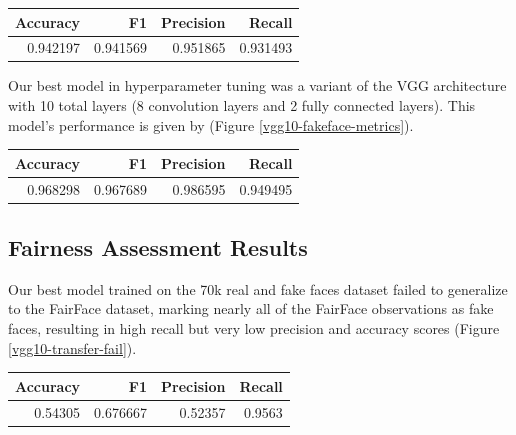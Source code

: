 \documentclass[11pt, letterpaper]{article}
\newenvironment{Figure}
  {\par\medskip\noindent\minipage{\linewidth}}
  {\endminipage\par\medskip}
\begin{document}
\begin{multicols}{2}
  \begin{Figure}
    \label{baseline-metrics}
    \begin{tabular}{rrrr}
    \toprule
     Accuracy &        F1 &  Precision &    Recall \\
    \midrule
     0.942197 &  0.941569 &   0.951865 &  0.931493 \\
    \bottomrule
    \end{tabular}
  \end{Figure}

  Our best model in hyperparameter tuning was a variant of the VGG architecture
  \cite{simonyan2015deep} with 10 total layers (8 convolution layers and 2 fully
  connected layers). This model's performance is given by
  (Figure \ref{vgg10-fakeface-metrics}).

  \begin{Figure}
    \centering
    \label{vgg10-fakeface-metrics}
    \begin{tabular}{rrrr}
    \toprule
     Accuracy &        F1 &  Precision &    Recall \\
    \midrule
     0.968298 &  0.967689 &   0.986595 &  0.949495 \\
    \bottomrule
    \end{tabular}
  \end{Figure}


  \subsection{Fairness Assessment Results}

  Our best model trained on the 70k real and fake faces dataset failed to
  generalize to the FairFace dataset, marking nearly all of the FairFace
  observations as fake faces, resulting in high recall but very low precision
  and accuracy scores (Figure \ref{vgg10-transfer-fail}).

  \begin{Figure}
    \centering
    \label{vgg10-transfer-fail}
    \begin{tabular}{rrrr}
    \toprule
    Accuracy &        F1 &  Precision &  Recall \\
    \midrule
      0.54305 &  0.676667 &    0.52357 &  0.9563 \\
    \bottomrule
    \end{tabular}
  \end{Figure}


\end{multicols}
\end{document}
